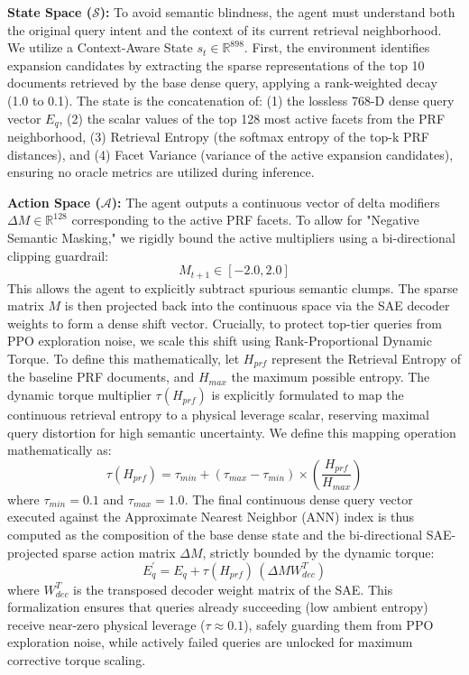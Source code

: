 \textbf{State Space ($\mathcal{S}$):} To avoid semantic blindness, the agent must understand both the original query intent and the context of its current retrieval neighborhood. We utilize a Context-Aware State $s_t \in \mathbb{R}^{898}$. First, the environment identifies expansion candidates by extracting the sparse representations of the top 10 documents retrieved by the base dense query, applying a rank-weighted decay (1.0 to 0.1). The state is the concatenation of: (1) the lossless 768-D dense query vector $E_q$, (2) the scalar values of the top 128 most active facets from the PRF neighborhood, (3) Retrieval Entropy (the softmax entropy of the top-k PRF distances), and (4) Facet Variance (variance of the active expansion candidates), ensuring no oracle metrics are utilized during inference.

\textbf{Action Space ($\mathcal{A}$):} The agent outputs a continuous vector of delta modifiers $\Delta M \in \mathbb{R}^{128}$ corresponding to the active PRF facets. To allow for "Negative Semantic Masking," we rigidly bound the active multipliers using a bi-directional clipping guardrail:
\begin{equation}
M_{t+1} \in [-2.0, 2.0]
\end{equation}
This allows the agent to explicitly subtract spurious semantic clumps. The sparse matrix $M$ is then projected back into the continuous space via the SAE decoder weights to form a dense shift vector. Crucially, to protect top-tier queries from PPO exploration noise, we scale this shift using Rank-Proportional Dynamic Torque. To define this mathematically, let $H_{prf}$ represent the Retrieval Entropy of the baseline PRF documents, and $H_{max}$ the maximum possible entropy. The dynamic torque multiplier $\tau(H_{prf})$ is explicitly formulated to map the continuous retrieval entropy to a physical leverage scalar, reserving maximal query distortion for high semantic uncertainty. We define this mapping operation mathematically as:
\begin{equation}
\tau(H_{prf}) = \tau_{min} + (\tau_{max} - \tau_{min}) \times \left( \frac{H_{prf}}{H_{max}} \right)
\end{equation}
where $\tau_{min} = 0.1$ and $\tau_{max} = 1.0$. The final continuous dense query vector executed against the Approximate Nearest Neighbor (ANN) index is thus computed as the composition of the base dense state and the bi-directional SAE-projected sparse action matrix $\Delta M$, strictly bounded by the dynamic torque:
\begin{equation}
E_q^{\prime} = E_q + \tau(H_{prf}) \, (\Delta M W_{dec}^T)
\end{equation}
where $W_{dec}^T$ is the transposed decoder weight matrix of the SAE. This formalization ensures that queries already succeeding (low ambient entropy) receive near-zero physical leverage ($\tau \approx 0.1$), safely guarding them from PPO exploration noise, while actively failed queries are unlocked for maximum corrective torque scaling.

